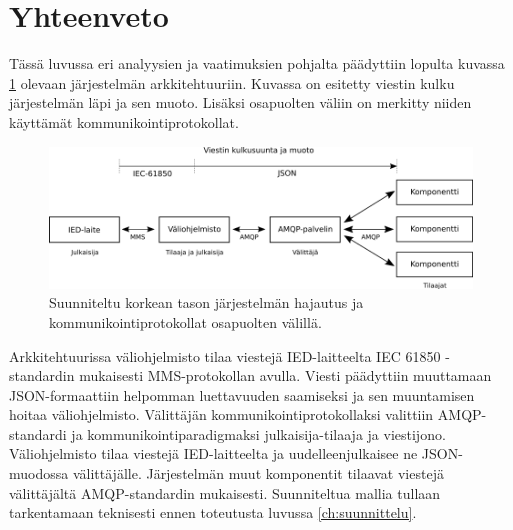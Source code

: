 \section{Yhteenveto}
Tässä luvussa eri analyysien ja vaatimuksien pohjalta päädyttiin lopulta kuvassa \ref{fig:high-level-system-architecture} olevaan järjestelmän arkkitehtuuriin. Kuvassa on esitetty viestin kulku järjestelmän läpi ja sen muoto. Lisäksi osapuolten väliin on merkitty niiden käyttämät kommunikointiprotokollat.

\begin{figure}[ht!]
	\includegraphics[width=1\textwidth]{pictures/high-level-system-architecture.png}
	\caption{Suunniteltu korkean tason järjestelmän hajautus ja kommunikointiprotokollat osapuolten välillä.}
	\label{fig:high-level-system-architecture}
\end{figure}

Arkkitehtuurissa väliohjelmisto tilaa viestejä IED-laitteelta IEC 61850 -standardin mukaisesti MMS-protokollan avulla. Viesti päädyttiin muuttamaan JSON-formaattiin helpomman luettavuuden saamiseksi ja sen muuntamisen hoitaa väliohjelmisto. Välittäjän kommunikointiprotokollaksi valittiin AMQP-standardi ja kommunikointiparadigmaksi jul\-kai\-si\-ja-ti\-laa\-ja ja viestijono. Väliohjelmisto tilaa viestejä IED-laitteelta ja uudelleenjulkaisee ne JSON-muodossa välittäjälle. Järjestelmän muut komponentit tilaavat viestejä välittäjältä AMQP-standardin mukaisesti. Suunniteltua mallia tullaan tarkentamaan teknisesti ennen toteutusta luvussa \ref{ch:suunnittelu}.